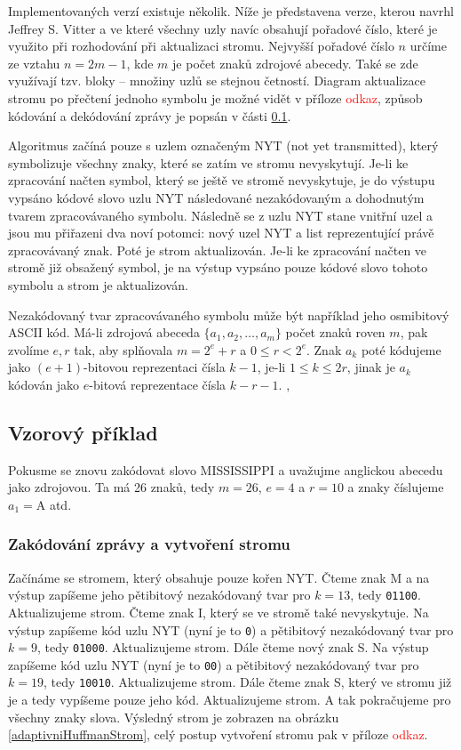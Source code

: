 Implementovaných verzí existuje několik. Níže je představena verze, kterou navrhl Jeffrey S. Vitter a ve které všechny uzly navíc obsahují pořadové číslo, které je využito při rozhodování při aktualizaci stromu. Nejvyšší pořadové číslo $n$ určíme ze vztahu $n = 2m -1$, kde $m$ je počet znaků zdrojové abecedy. Také se zde využívají tzv. bloky -- množiny uzlů se stejnou četností. Diagram aktualizace stromu po přečtení jednoho symbolu je možné vidět v příloze \textcolor{red}{odkaz}, způsob kódování a dekódování zprávy je popsán v části \ref{prikladAdaptivniHuffman}.

Algoritmus začíná pouze s uzlem označeným NYT (not yet transmitted), který symbolizuje všechny znaky, které se zatím ve stromu nevyskytují. Je-li ke zpracování načten symbol, který se ještě ve stromě nevyskytuje, je do výstupu vypsáno kódové slovo uzlu NYT následované nezakódovaným a dohodnutým tvarem zpracovávaného symbolu. Následně se z uzlu NYT stane vnitřní uzel a jsou mu přiřazeni dva noví potomci: nový uzel NYT a list reprezentující právě zpracovávaný znak. Poté je strom aktualizován. Je-li ke zpracování načten ve stromě již obsažený symbol, je na výstup vypsáno pouze kódové slovo tohoto symbolu a strom je aktualizován.

Nezakódovaný tvar zpracovávaného symbolu může být například jeho osmibitový ASCII kód. Má-li zdrojová abeceda $\{a_1, a_2, \ldots, a_m\}$ počet znaků roven $m$, pak zvolíme $e,r$ tak, aby splňovala $m= 2^e + r$ a $0 \leq r < 2^e$. Znak $a_k$ poté kódujeme jako $(e+1)$-bitovou reprezentaci čísla $k-1$, je-li $1 \leq k \leq 2r$, jinak je $a_k$ kódován jako $e$-bitová reprezentace čísla $k-r-1$. \cite{dataCompression}, \cite{introductionToDataCompression}

\subsection{Vzorový příklad}
\label{prikladAdaptivniHuffman}
Pokusme se znovu zakódovat slovo MISSISSIPPI a uvažujme anglickou abecedu jako zdrojovou. Ta má 26 znaků, tedy $m=26$, $e = 4$ a $r=10$ a znaky číslujeme $a_1 = \mathrm{A}$ atd.

\subsubsection{Zakódování zprávy a vytvoření stromu}
Začínáme se stromem, který obsahuje pouze kořen NYT. Čteme znak M a na výstup zapíšeme jeho pětibitový nezakódovaný tvar pro $k=13$, tedy \texttt{01100}. Aktualizujeme strom. Čteme znak I, který se ve stromě také nevyskytuje. Na výstup zapíšeme kód uzlu NYT (nyní je to \texttt{0}) a pětibitový nezakódovaný tvar pro $k=9$, tedy \texttt{01000}. Aktualizujeme strom. Dále čteme nový znak S. Na výstup zapíšeme kód uzlu NYT (nyní je to \texttt{00}) a pětibitový nezakódovaný tvar pro $k=19$, tedy \texttt{10010}. Aktualizujeme strom. Dále čteme znak S, který ve stromu již je a tedy vypíšeme pouze jeho kód. Aktualizujeme strom. A tak pokračujeme pro všechny znaky slova. Výsledný strom je zobrazen na obrázku \ref{adaptivniHuffmanStrom}, celý postup vytvoření stromu pak v příloze \textcolor{red}{odkaz}. 

